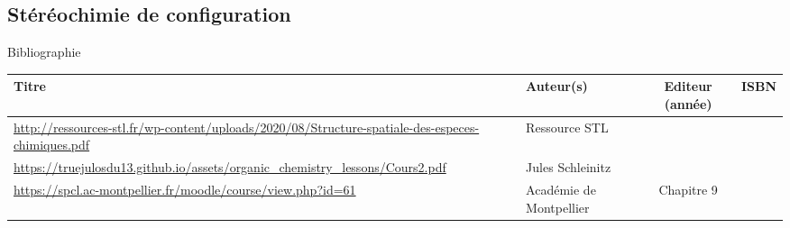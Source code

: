 \begin{headerBlock}
\chapter{Stéréochimie de configuration}
\label{LC_Stéréochimie}
 \end{headerBlock}



\begin{reportBlock}{Bibliographie}

\begin{center}
\begin{tabularx}{\textwidth}{| X | X | c | c |}\hline
Titre & Auteur(s) & Editeur (année) & ISBN \\ \hline
\url{http://ressources-stl.fr/wp-content/uploads/2020/08/Structure-spatiale-des-especes-chimiques.pdf} & Ressource STL & ~ & ~ \\
\hline
\url{https://truejulosdu13.github.io/assets/organic_chemistry_lessons/Cours2.pdf} & Jules Schleinitz &  ~ & ~ \\ \hline
 \url{https://spcl.ac-montpellier.fr/moodle/course/view.php?id=61} & Académie de Montpellier & Chapitre 9 & ~ \\ 
 \hline
\end{tabularx}
\end{center}

\end{reportBlock}

